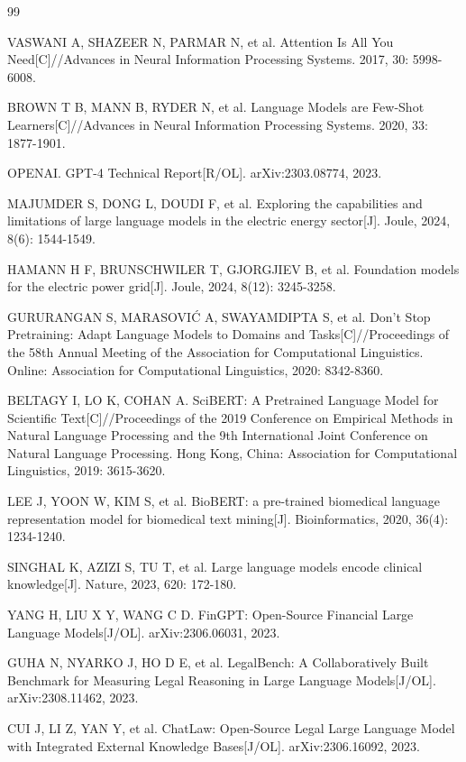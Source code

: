 \documentclass[fontset=fandol,type=master,campus=shenzhen,etitleauto=true]{hithesisbook}
\begin{document}
\begin{thebibliography}{99}

 VASWANI A, SHAZEER N, PARMAR N, et al. Attention Is All You Need[C]//Advances in Neural Information Processing Systems. 2017, 30: 5998-6008.

 BROWN T B, MANN B, RYDER N, et al. Language Models are Few-Shot Learners[C]//Advances in Neural Information Processing Systems. 2020, 33: 1877-1901.

 OPENAI. GPT-4 Technical Report[R/OL]. arXiv:2303.08774, 2023.

 MAJUMDER S, DONG L, DOUDI F, et al. Exploring the capabilities and limitations of large language models in the electric energy sector[J]. Joule, 2024, 8(6): 1544-1549.

 HAMANN H F, BRUNSCHWILER T, GJORGJIEV B, et al. Foundation models for the electric power grid[J]. Joule, 2024, 8(12): 3245-3258.

 GURURANGAN S, MARASOVIĆ A, SWAYAMDIPTA S, et al. Don't Stop Pretraining: Adapt Language Models to Domains and Tasks[C]//Proceedings of the 58th Annual Meeting of the Association for Computational Linguistics. Online: Association for Computational Linguistics, 2020: 8342-8360.

 BELTAGY I, LO K, COHAN A. SciBERT: A Pretrained Language Model for Scientific Text[C]//Proceedings of the 2019 Conference on Empirical Methods in Natural Language Processing and the 9th International Joint Conference on Natural Language Processing. Hong Kong, China: Association for Computational Linguistics, 2019: 3615-3620.

 LEE J, YOON W, KIM S, et al. BioBERT: a pre-trained biomedical language representation model for biomedical text mining[J]. Bioinformatics, 2020, 36(4): 1234-1240.

 SINGHAL K, AZIZI S, TU T, et al. Large language models encode clinical knowledge[J]. Nature, 2023, 620: 172-180.

 YANG H, LIU X Y, WANG C D. FinGPT: Open-Source Financial Large Language Models[J/OL]. arXiv:2306.06031, 2023.

 GUHA N, NYARKO J, HO D E, et al. LegalBench: A Collaboratively Built Benchmark for Measuring Legal Reasoning in Large Language Models[J/OL]. arXiv:2308.11462, 2023.

 CUI J, LI Z, YAN Y, et al. ChatLaw: Open-Source Legal Large Language Model with Integrated External Knowledge Bases[J/OL]. arXiv:2306.16092, 2023.


\end{thebibliography}
\end{document}
